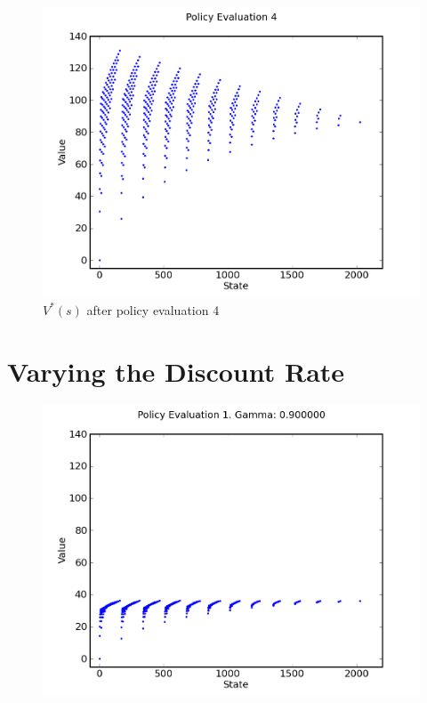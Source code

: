 \documentclass[a4paper]{article}
\begin{document}
\begin{figure}[h]
\center
\includegraphics[scale=0.75]{policy_iteration/evaluation_4.png}
\caption{$V^*(s)$ after policy evaluation 4}
\end{figure}


\clearpage

\section{Varying the Discount Rate}





\begin{figure}[h]
\center
\includegraphics[scale=0.75]{gamma_iteration/gamma_9_1.png}
\end{figure}
\end{document}
